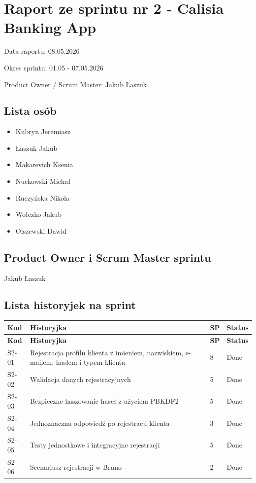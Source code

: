 \documentclass[12pt,a4paper]{article}
\begin{document}
\section*{Raport ze sprintu nr 2 - Calisia Banking App}
Data raportu: 08.05.2026

Okres sprintu: 01.05 - 07.05.2026

Product Owner / Scrum Master: Jakub Łaszuk

\subsection*{Lista osób}
\begin{itemize}
\item Kubryn Jeremiasz
\item Łaszuk Jakub
\item Makarevich Ksenia
\item Nuckowski Michał
\item Ruczyńska Nikola
\item Wołczko Jakub
\item Olszewski Dawid
\end{itemize}

\subsection*{Product Owner i Scrum Master sprintu}
Jakub Łaszuk

\subsection*{Lista historyjek na sprint}
\begingroup
\footnotesize
{}
\begin{longtable}{@{}C{0.08\textwidth}L{0.62\textwidth}C{0.10\textwidth}L{0.12\textwidth}@{}}
\toprule
{}
\textbf{Kod} & \textbf{Historyjka} & \textbf{SP} & \textbf{Status} \\
\midrule
\endfirsthead
\toprule
{}
\textbf{Kod} & \textbf{Historyjka} & \textbf{SP} & \textbf{Status} \\
\midrule
\endhead
S2-01 & Rejestracja profilu klienta z imieniem, nazwiskiem, e-mailem, hasłem i typem klienta & 8 & Done \\
S2-02 & Walidacja danych rejestracyjnych & 5 & Done \\
S2-03 & Bezpieczne haszowanie haseł z użyciem PBKDF2 & 5 & Done \\
S2-04 & Jednoznaczna odpowiedź po rejestracji klienta & 3 & Done \\
S2-05 & Testy jednostkowe i integracyjne rejestracji & 5 & Done \\
S2-06 & Scenariusz rejestracji w Bruno & 2 & Done \\
\bottomrule
\end{longtable}
\endgroup
\end{document}

